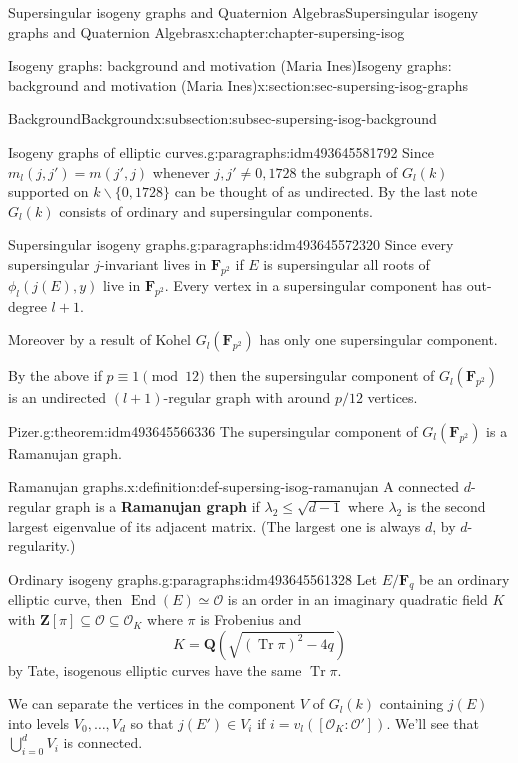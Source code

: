 \documentclass[oneside,10pt,]{book}
\newcommand{\terminology}[1]{\textbf{#1}}
\numberwithin{equation}{section}
\newcommand{\lb}{[}
\newcommand{\rb}{]}
\newcommand{\ZZ}{\mathbf{Z}}
\newcommand{\QQ}{\mathbf{Q}}
\newcommand{\FF}{\mathbf{F}}
\newcommand{\ints}{\mathcal{O}}
\DeclareMathOperator{\End}{End}
\DeclareMathOperator{\trace}{Tr}
\begin{document}
\begin{chapterptx}{Supersingular isogeny graphs and Quaternion Algebras}{}{Supersingular isogeny graphs and Quaternion Algebras}{}{}{x:chapter:chapter-supersing-isog}
\begin{sectionptx}{Isogeny graphs: background and motivation (Maria Ines)}{}{Isogeny graphs: background and motivation (Maria Ines)}{}{}{x:section:sec-supersing-isog-graphs}
\begin{subsectionptx}{Background}{}{Background}{}{}{x:subsection:subsec-supersing-isog-background}
\begin{paragraphs}{Isogeny graphs of elliptic curves.}{g:paragraphs:idm493645581792}
Since \(m_l(j,j') =  m(j',j)\) whenever \(j,j' \ne  0,1728\) the subgraph of \(G_l(k)\) supported on \(k\smallsetminus \{0,1728\}\) can be thought of as undirected. By the last note \(G_l(k)\) consists of ordinary and supersingular components.%
\end{paragraphs}%
\begin{paragraphs}{Supersingular isogeny graphs.}{g:paragraphs:idm493645572320}%
Since every supersingular \(j\)-invariant lives in \(\FF_{p^2}\) if \(E\) is supersingular all roots of \(\phi_l(j(E), y)\) live in \(\FF_{p^2}\). Every vertex in a supersingular component has out-degree \(l+1\).%
\par
Moreover by a result of Kohel \(G_l(\FF_{p^2})\) has only one supersingular component.%
\par
By the above if \(p \equiv 1 \pmod {12}\) then the supersingular component of \(G_l(\FF_{p^2})\) is an undirected \((l+1)\)-regular graph with around \(p/12\) vertices.%
\begin{theorem}{Pizer.}{}{g:theorem:idm493645566336}%
The supersingular component of \(G_l(\FF_{p^2})\) is a Ramanujan graph.%
\end{theorem}
\begin{definition}{Ramanujan graphs.}{x:definition:def-supersing-isog-ramanujan}%
A connected \(d\)-regular graph is a \terminology{Ramanujan graph} if \(\lambda_2 \le \sqrt{d-1}\) where \(\lambda_2\) is the second largest eigenvalue of its adjacent matrix. (The largest one is always \(d\), by \(d\)-regularity.)%
\end{definition}
\end{paragraphs}%
\begin{paragraphs}{Ordinary isogeny graphs.}{g:paragraphs:idm493645561328}%
Let \(E/\FF_q\) be an ordinary elliptic curve, then \(\End(E) \simeq \ints\) is an order in an imaginary quadratic field \(K\) with \(\ZZ\lb \pi \rb \subseteq \ints \subseteq \ints_K\) where \(\pi\) is Frobenius and%
\begin{equation*}
K = \QQ(\sqrt{(\trace \pi)^2 - 4q})
\end{equation*}
by Tate, isogenous elliptic curves have the same \(\trace \pi\).%
\par
We can separate the vertices in the component \(V\) of \(G_l(k)\) containing \(j(E)\) into levels \(V_0, \ldots, V_d\) so that \(j(E') \in V_i\) if \(i = v_l(\lb \ints_K : \ints'\rb)\). We'll see that \(\bigcup_{i=0}^d V_i\) is connected.%
\par

\end{paragraphs}
\end{subsectionptx}
\end{sectionptx}
\end{chapterptx}
\end{document}
